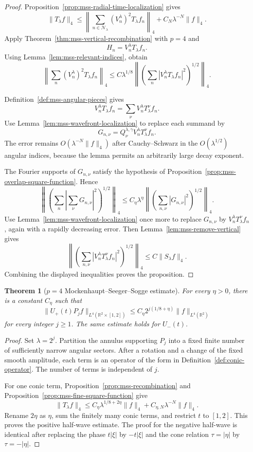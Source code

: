 \documentclass[11pt]{article}
\numberwithin{equation}{section}
\newtheorem{theorem}{Theorem}[section]
\theoremstyle{definition}
\theoremstyle{remark}
\newcommand{\R}{\mathbb R}
\begin{document}
\begin{proof}
Proposition~\ref{prop:mss-radial-time-localization} gives
\[
\|T_\lambda f\|_4
\le\left\|\sum_{n\in\mathcal N_\lambda}(V_n^\lambda)^2T_\lambda f_n\right\|_4
+C_N\lambda^{-N}\|f\|_4.
\]
Apply Theorem~\ref{thm:mss-vertical-recombination} with $p=4$ and
\[
H_n=V_n^\lambda T_\lambda f_n.
\]
Using Lemma~\ref{lem:mss-relevant-indices}, obtain
\[
\left\|\sum_n(V_n^\lambda)^2T_\lambda f_n\right\|_4
\le C\lambda^{1/8}
\left\|\left(\sum_n|V_n^\lambda T_\lambda f_n|^2\right)^{1/2}\right\|_4.
\]

Definition~\ref{def:mss-angular-pieces} gives
\[
V_n^\lambda T_\lambda f_n
=\sum_\nu V_n^\lambda T_\lambda^\nu f_n.
\]
Use Lemma~\ref{lem:mss-wavefront-localization} to replace each summand by
\[
G_{n,\nu}=Q_\nu^{\lambda,\gamma}V_n^\lambda T_\lambda^\nu f_n.
\]
The error remains $O(\lambda^{-N}\|f\|_4)$ after Cauchy--Schwarz in the $O(\lambda^{1/2})$ angular indices, because the lemma permits an arbitrarily large decay exponent.

The Fourier supports of $G_{n,\nu}$ satisfy the hypothesis of Proposition~\ref{prop:mss-overlap-square-function}.  Hence
\[
\left\|\left(\sum_n\left|\sum_\nu G_{n,\nu}\right|^2\right)^{1/2}\right\|_4
\le C_\eta\lambda^\eta
\left\|\left(\sum_{n,\nu}|G_{n,\nu}|^2\right)^{1/2}\right\|_4.
\]
Use Lemma~\ref{lem:mss-wavefront-localization} once more to replace $G_{n,\nu}$ by $V_n^\lambda T_\lambda^\nu f_n$, again with a rapidly decreasing error.  Then Lemma~\ref{lem:mss-remove-vertical} gives
\[
\left\|\left(\sum_{n,\nu}|V_n^\lambda T_\lambda^\nu f_n|^2\right)^{1/2}\right\|_4
\le C\|S_\lambda f\|_4.
\]
Combining the displayed inequalities proves the proposition.
\end{proof}

\begin{theorem}[$p=4$ Mockenhaupt--Seeger--Sogge estimate]\label{thm:mss-p4}
For every $\eta>0$, there is a constant $C_\eta$ such that
\[
\|U_+(t)P_jf\|_{L^4(\R^2\times[1,2])}
\le C_\eta2^{j(1/8+\eta)}\|f\|_{L^4(\R^2)}
\]
for every integer $j\ge1$.  The same estimate holds for $U_-(t)$.
\end{theorem}

\begin{proof}
Set $\lambda=2^j$.  Partition the annulus supporting $P_j$ into a fixed finite number of sufficiently narrow angular sectors.  After a rotation and a change of the fixed smooth amplitude, each term is an operator of the form in Definition~\ref{def:conic-operator}.  The number of terms is independent of $j$.

For one conic term, Proposition~\ref{prop:mss-recombination} and Proposition~\ref{prop:mss-fine-square-function} give
\[
\|T_\lambda f\|_4
\le C_\eta\lambda^{1/8+2\eta}\|f\|_4+C_{\eta,N}\lambda^{-N}\|f\|_4.
\]
Rename $2\eta$ as $\eta$, sum the finitely many conic terms, and restrict $t$ to $[1,2]$.  This proves the positive half-wave estimate.  The proof for the negative half-wave is identical after replacing the phase $t|\xi|$ by $-t|\xi|$ and the cone relation $\tau=|\eta|$ by $\tau=-|\eta|$.
\end{proof}
\end{document}
